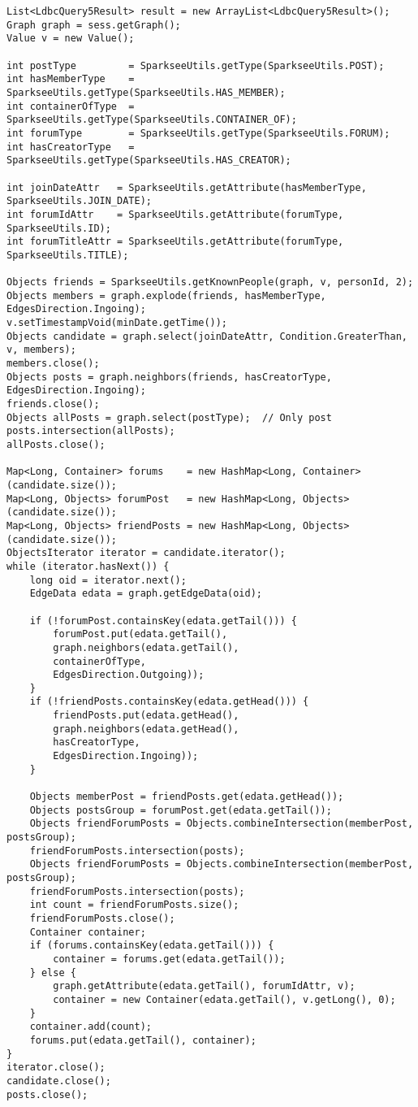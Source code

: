 {\footnotesize
\begin{verbatim}
List<LdbcQuery5Result> result = new ArrayList<LdbcQuery5Result>();
Graph graph = sess.getGraph();
Value v = new Value();

int postType         = SparkseeUtils.getType(SparkseeUtils.POST);
int hasMemberType    = SparkseeUtils.getType(SparkseeUtils.HAS_MEMBER);
int containerOfType  = SparkseeUtils.getType(SparkseeUtils.CONTAINER_OF);
int forumType        = SparkseeUtils.getType(SparkseeUtils.FORUM);
int hasCreatorType   = SparkseeUtils.getType(SparkseeUtils.HAS_CREATOR);

int joinDateAttr   = SparkseeUtils.getAttribute(hasMemberType, SparkseeUtils.JOIN_DATE);
int forumIdAttr    = SparkseeUtils.getAttribute(forumType, SparkseeUtils.ID);
int forumTitleAttr = SparkseeUtils.getAttribute(forumType, SparkseeUtils.TITLE);

Objects friends = SparkseeUtils.getKnownPeople(graph, v, personId, 2);
Objects members = graph.explode(friends, hasMemberType, EdgesDirection.Ingoing);
v.setTimestampVoid(minDate.getTime());
Objects candidate = graph.select(joinDateAttr, Condition.GreaterThan, v, members);
members.close();
Objects posts = graph.neighbors(friends, hasCreatorType, EdgesDirection.Ingoing);
friends.close();
Objects allPosts = graph.select(postType);  // Only post
posts.intersection(allPosts);
allPosts.close();

Map<Long, Container> forums    = new HashMap<Long, Container>(candidate.size());
Map<Long, Objects> forumPost   = new HashMap<Long, Objects>(candidate.size());
Map<Long, Objects> friendPosts = new HashMap<Long, Objects>(candidate.size());
ObjectsIterator iterator = candidate.iterator();
while (iterator.hasNext()) {
    long oid = iterator.next();
    EdgeData edata = graph.getEdgeData(oid);

    if (!forumPost.containsKey(edata.getTail())) {
        forumPost.put(edata.getTail(), 
        graph.neighbors(edata.getTail(), 
        containerOfType,  
        EdgesDirection.Outgoing));
    }
    if (!friendPosts.containsKey(edata.getHead())) {
        friendPosts.put(edata.getHead(), 
        graph.neighbors(edata.getHead(),
        hasCreatorType, 
        EdgesDirection.Ingoing));
    }

    Objects memberPost = friendPosts.get(edata.getHead());
    Objects postsGroup = forumPost.get(edata.getTail());
    Objects friendForumPosts = Objects.combineIntersection(memberPost, postsGroup);
    friendForumPosts.intersection(posts);
    Objects friendForumPosts = Objects.combineIntersection(memberPost, postsGroup);
    friendForumPosts.intersection(posts);
    int count = friendForumPosts.size();
    friendForumPosts.close();
    Container container;
    if (forums.containsKey(edata.getTail())) {
        container = forums.get(edata.getTail());
    } else {
        graph.getAttribute(edata.getTail(), forumIdAttr, v);
        container = new Container(edata.getTail(), v.getLong(), 0);
    }
    container.add(count);
    forums.put(edata.getTail(), container);
}
iterator.close();
candidate.close();
posts.close();


\end{verbatim}}
